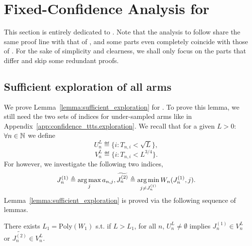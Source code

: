 \section{Fixed-Confidence Analysis for \texorpdfstring{\TCC}{}}\label{app:confidence_t3c}

This section is entirely dedicated to \TCC. Note that the analysis to follow share the same proof line with that of \TTTS, and some parts even completely coincide with those of \TTTS. For the sake of simplicity and clearness, we shall only focus on the parts that differ and skip some redundant proofs. 

\subsection{Sufficient exploration of all arms}\label{app:confidence_t3c.exploration}

We prove Lemma~\ref{lemma:sufficient_exploration} for \TCC. To prove this lemma, we still need the two sets of indices for under-sampled arms like in Appendix~\ref{app:confidence_ttts.exploration}. We recall that for a given $L>0$: $\forall n\in{\mathbb N}$ we define
\[
    U_n^L \eqdef \{i: T_{n,i} < \sqrt{L}\},
\]
\[
    V_n^L \eqdef \{i: T_{n,i} < L^{3/4}\}.
\]
For \TCC however, we investigate the following two indices,
\[
    J_n^{(1)} \triangleq \operatorname*{arg\,max}_{j} a_{n,j}, \widetilde{J_n^{(2)}} \triangleq \operatorname*{arg\,min}_{j\neq J_n^{(1)}} W_n(J_n^{(1)},j).
\]
Lemma~\ref{lemma:sufficient_exploration} is proved via the following sequence of lemmas.

\begin{lemma}\label{lemma:link_t3c}
\begin{leftbar}[lemmabar]
    There exists $L_1 = \text{Poly}(W_1)$ s.t. if $L > L_1$, for all $n$, $U_n^L \neq \emptyset$ implies $J_n^{(1)} \in V_n^L$ or $\tilde{J_n^{(2)}} \in V_n^L$.
\end{leftbar}
\end{lemma}

